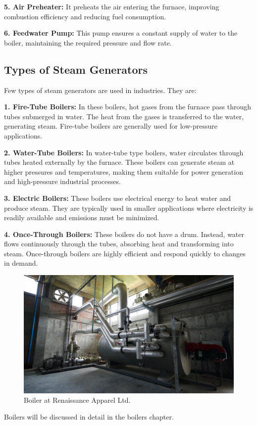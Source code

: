 \textbf{5. Air Preheater:} It preheats the air entering the furnace, improving combustion efficiency and reducing fuel consumption.

\textbf{6. Feedwater Pump:} This pump ensures a constant supply of water to the boiler, maintaining the required pressure and flow rate.

\subsection{Types of Steam Generators}
Few types of steam generators are used in industries. They are:

\textbf{1. Fire-Tube Boilers:} In these boilers, hot gases from the furnace pass through tubes submerged in water. The heat from the gases is transferred to the water, generating steam. Fire-tube boilers are generally used for low-pressure applications.

\textbf{2. Water-Tube Boilers:} In water-tube type boilers, water circulates through tubes heated externally by the furnace. These boilers can generate steam at higher pressures and temperatures, making them suitable for power generation and high-pressure industrial processes.

\textbf{3. Electric Boilers:} These boilers use electrical energy to heat water and produce steam. They are typically used in smaller applications where electricity is readily available and emissions must be minimized.

\textbf{4. Once-Through Boilers:} These boilers do not have a drum. Instead, water flows continuously through the tubes, absorbing heat and transforming into steam. Once-through boilers are highly efficient and respond quickly to changes in demand.

\begin{figure}[h!]
    \centering
    \includegraphics[width=0.8\linewidth]{figs/boiler.jpg}
    \caption{Boiler at Renaissance Apparel Ltd.}
    \label{fig:boiler}
\end{figure}
Boilers will be discussed in detail in the boilers chapter.

